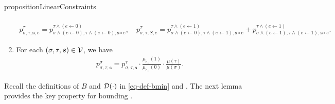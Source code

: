 \documentclass[11pt]{article}
\newcommand{\seqS}{\boldsymbol{s}}
\newcommand{\hktodo}[1]{{\color{blue}{#1}}}
\begin{document}
\begin{restatable}{proposition}{LinearConstraints}
\begin{enumerate}[(1)]
\begin{align}
            \end{align}
            \begin{align}\label{eqn-inner-child-sum4}
                p^{\tau}_{\sigma,\tau, \seqS,e}=p^{\tau\land (e\gets 0)}_{\sigma\land (e\gets 0),\tau\land (e\gets 0), \seqS\circ e}, \quad  p^{\tau}_{\sigma,\tau,S,e}=p^{\tau\land (e\gets 1)}_{\sigma\land (e\gets 0),\tau\land (e\gets 1), \seqS \circ e} + p^{\tau \land (e\gets 1)}_{\sigma\land (e\gets 1),\tau\land (e\gets 1), \seqS\circ e}.
            \end{align}
            \item For each $(\sigma, \tau, \seqS) \in \+V$, we have
            \begin{align}\label{eqn-ratio}
            	{p^{\sigma}_{\sigma,\tau, \seqS}} = p^{\tau}_{\sigma,\tau, \seqS} \cdot \frac{\mu_{e_{\bot}}(1)}{\mu_{e_{\bot}}(0)}\cdot \frac{ \mu(\tau)}{ \mu(\sigma)}.
            \end{align}
        \end{enumerate}
    \end{restatable}
    
    Recall the definitions of $B$ and $\mathcal{D}(\cdot)$ in \eqref{eq-def-bmin} and . The next lemma provides the key property for bounding \hktodo{the coupling error}.
\end{document}
